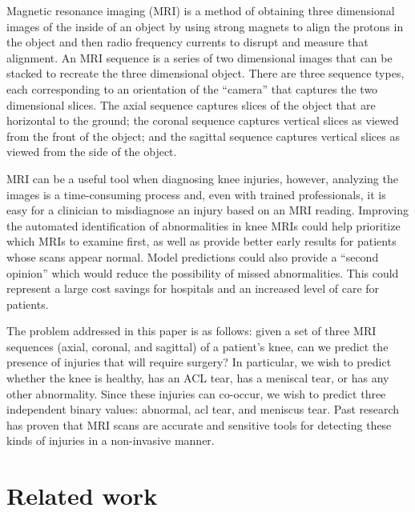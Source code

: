 \documentclass[10pt,twocolumn,letterpaper]{article}
\begin{document}
Magnetic resonance imaging (MRI) is a method of obtaining three dimensional images of the inside of an object by using strong magnets to align the protons in the object and then radio frequency currents to disrupt and measure that alignment. An MRI sequence is a series of two dimensional images that can be stacked to recreate the three dimensional object. There are three sequence types, each corresponding to an orientation of the ``camera'' that captures the two dimensional slices. The axial sequence captures slices of the object that are horizontal to the ground; the coronal sequence captures vertical slices as viewed from the front of the object; and the sagittal sequence captures vertical slices as viewed from the side of the object.

MRI can be a useful tool when diagnosing knee injuries\cite{orlando2015diagnosis,figueiredo2018use,smith2012diagnostic}, however, analyzing the images is a time-consuming process and, even with trained professionals, it is easy for a clinician to misdiagnose an injury based on an MRI reading\cite{kolata2011}. Improving the automated identification of abnormalities in knee MRIs could help prioritize which MRIs to examine first, as well as provide better early results for patients whose scans appear normal. Model predictions could also provide a ``second opinion'' which would reduce the possibility of missed abnormalities. This could represent a large cost savings for hospitals and an increased level of care for patients.

The problem addressed in this paper is as follows: given a set of three MRI sequences (axial, coronal, and sagittal) of a patient's knee, can we predict the presence of injuries that will require surgery? In particular, we wish to predict whether the knee is healthy, has an ACL tear, has a meniscal tear, or has any other abnormality. Since these injuries can co-occur, we wish to predict three independent binary values: abnormal, acl tear, and meniscus tear. Past research has proven that MRI scans are accurate and sensitive tools for detecting these kinds of injuries in a non-invasive manner\cite{boeve1991magnetic,felli2016comparison,yaqoob2015diagnostic}.


\section{Related work}
\label{related-work} %
\end{document}
